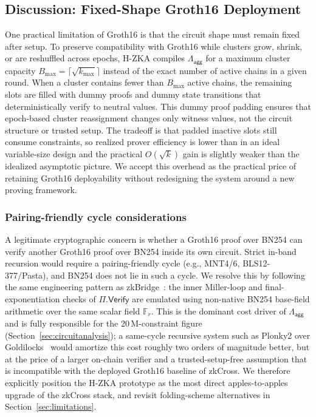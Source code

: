 \documentclass[journal]{IEEEtran}
\newcommand{\aggCircuit}{\Lambda_{\mathsf{agg}}}
\begin{document}
\subsection{Discussion: Fixed-Shape Groth16 Deployment}
\label{sec:fixedshape}

One practical limitation of Groth16 is that the circuit shape must remain fixed after setup. To preserve compatibility with Groth16 while clusters grow, shrink, or are reshuffled across epochs, H-ZKA compiles $\aggCircuit$ for a maximum cluster capacity $B_{\max} = \lceil \sqrt{k_{\max}} \rceil$ instead of the exact number of active chains in a given round. When a cluster contains fewer than $B_{\max}$ active chains, the remaining slots are filled with dummy proofs and dummy state transitions that deterministically verify to neutral values. This {dummy proof padding} ensures that epoch-based cluster reassignment changes only witness values, not the circuit structure or trusted setup. The tradeoff is that padded inactive slots still consume constraints, so realized prover efficiency is lower than in an ideal variable-size design and the practical $O(\sqrt{k})$ gain is slightly weaker than the idealized asymptotic picture. We accept this overhead as the practical price of retaining Groth16 deployability without redesigning the system around a new proving framework.

\subsubsection{Pairing-friendly cycle considerations}

A legitimate cryptographic concern is whether a Groth16 proof over BN254 can verify another Groth16 proof over BN254 inside its own circuit. Strict in-band recursion would require a pairing-friendly cycle (e.g., MNT4/6, BLS12-377/Pasta), and BN254 does not lie in such a cycle. We resolve this by following the same engineering pattern as zkBridge~\cite{xie2022zkbridge}: the inner Miller-loop and final-exponentiation checks of $\Pi.\mathsf{Verify}$ are emulated using non-native BN254 base-field arithmetic over the same scalar field $\mathbb{F}_r$. This is the dominant cost driver of $\aggCircuit$ and is fully responsible for the $20\,$M-constraint figure (Section~\ref{sec:circuitanalysis}); a same-cycle recursive system such as Plonky2 over Goldilocks~\cite{plonky2} would amortize this cost roughly two orders of magnitude better, but at the price of a larger on-chain verifier and a trusted-setup-free assumption that is incompatible with the deployed Groth16 baseline of zkCross. We therefore explicitly position the H-ZKA prototype as the most direct apples-to-apples upgrade of the zkCross stack, and revisit folding-scheme alternatives in Section~\ref{sec:limitations}.
\end{document}
